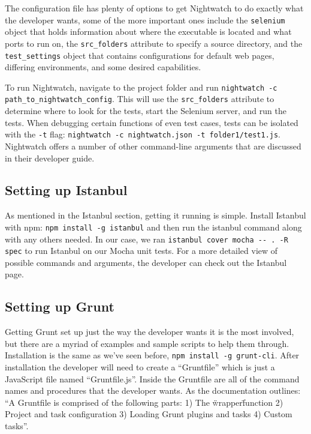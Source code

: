 \documentclass[12pt]{ucthesis}
\begin{document}
The configuration file has plenty of options to get Nightwatch to do exactly what the developer wants, some of the more important ones include the \lstinline{selenium} object that holds information about where the executable is located and what ports to run on, the \lstinline{src_folders} attribute to specify a source directory, and the \lstinline{test_settings} object that contains configurations for default web pages, differing environments, and some desired capabilities. 

To run Nightwatch, navigate to the project folder and run \lstinline{nightwatch -c path_to_nightwatch_config}. This will use the \lstinline{src_folders} attribute to determine where to look for the tests, start the Selenium server, and run the tests. When debugging certain functions of even test cases, tests can be isolated with the \lstinline{-t} flag: \lstinline{nightwatch -c nightwatch.json -t folder1/test1.js}. Nightwatch offers a number of other command-line arguments that are discussed in their developer guide. \cite{NightwatchJS}

\subsection{Setting up Istanbul}
As mentioned in the Istanbul section, getting it running is simple. Install Istanbul with npm: \lstinline{npm install -g istanbul} and then run the istanbul command along with any others needed. In our case, we ran \lstinline{istanbul cover mocha -- . -R spec} to run Istanbul on our Mocha unit tests. For a more detailed view of possible commands and arguments, the developer can check out the Istanbul page. \cite{Istanbul}

\subsection{Setting up Grunt}
Getting Grunt set up just the way the developer wants it is the most involved, but there are a myriad of examples and sample scripts to help them through. Installation is the same as we've seen before, \lstinline{npm install -g grunt-cli}. After installation the developer will need to create a ``Gruntfile'' which is just a JavaScript file named ``Gruntfile.js''. Inside the Gruntfile are all of the command names and procedures that the developer wants. As the documentation outlines: ``A Gruntfile is comprised of the following parts: 1) The \"wrapper\" function 2) Project and task configuration 3) Loading Grunt plugins and tasks 4) Custom tasks''. \cite{GruntJS}
\end{document}
